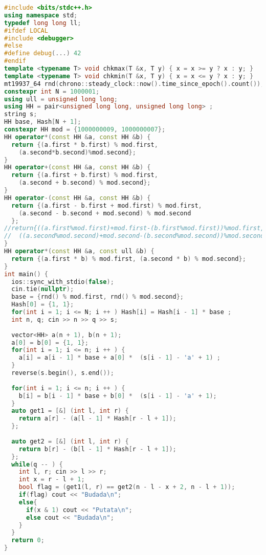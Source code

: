 \begin{lstlisting}[language=C++]
#include <bits/stdc++.h>
using namespace std;
typedef long long ll;
#ifdef LOCAL
#include <debugger>
#else
#define debug(...) 42
#endif
template <typename T> void chkmax(T &x, T y) { x = x >= y ? x : y; }
template <typename T> void chkmin(T &x, T y) { x = x <= y ? x : y; }
mt19937_64 rnd(chrono::steady_clock::now().time_since_epoch().count());
constexpr int N = 1000001;
using ull = unsigned long long;
using HH = pair<unsigned long long, unsigned long long> ;
string s; 
HH base, Hash[N + 1]; 
constexpr HH mod = {1000000009, 1000000007};
HH operator*(const HH &a, const HH &b) {
  return {(a.first * b.first) % mod.first,
    (a.second*b.second)%mod.second};
}
HH operator+(const HH &a, const HH &b) {
  return {(a.first + b.first) % mod.first, 
    (a.second + b.second) % mod.second};
}
HH operator-(const HH &a, const HH &b) {
  return {(a.first - b.first + mod.first) % mod.first, 
    (a.second - b.second + mod.second) % mod.second
  };
//return{((a.first%mod.first)+mod.first-(b.first%mod.first))%mod.first,
//  ((a.second%mod.second)+mod.second-(b.second%mod.second))%mod.second};
}
HH operator*(const HH &a, const ull &b) {
  return {(a.first * b) % mod.first, (a.second * b) % mod.second};
}
int main() {
  ios::sync_with_stdio(false);
  cin.tie(nullptr);
  base = {rnd() % mod.first, rnd() % mod.second};
  Hash[0] = {1, 1};
  for(int i = 1; i <= N; i ++ ) Hash[i] = Hash[i - 1] * base ;
  int n, q; cin >> n >> q >> s;
  
  vector<HH> a(n + 1), b(n + 1);
  a[0] = b[0] = {1, 1};
  for(int i = 1; i <= n; i ++ ) {
    a[i] = a[i - 1] * base + a[0] *  (s[i - 1] - 'a' + 1) ;
  }
  reverse(s.begin(), s.end());
 
  for(int i = 1; i <= n; i ++ ) {
    b[i] = b[i - 1] * base + b[0] *  (s[i - 1] - 'a' + 1);
  }
  auto get1 = [&] (int l, int r) {
    return a[r] - (a[l - 1] * Hash[r - l + 1]);
  };
 
  auto get2 = [&] (int l, int r) {
    return b[r] - (b[l - 1] * Hash[r - l + 1]);
  };
  while(q -- ) {
    int l, r; cin >> l >> r;
    int x = r - l + 1;
    bool flag = (get1(l, r) == get2(n - l - x + 2, n - l + 1));
    if(flag) cout << "Budada\n";
    else{
      if(x & 1) cout << "Putata\n";
      else cout << "Budada\n";
    }
  }
  return 0;
}
\end{lstlisting}
